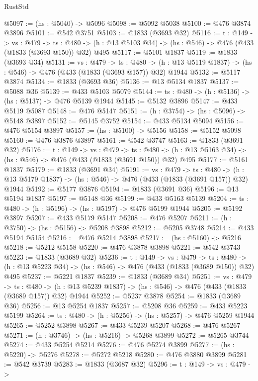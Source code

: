 \begin{lexlean}{RustStd}
\begin{coremodule}
@5097 := (hs : @5040) -> @5096
@5098 := @5092 @5038
@5100 := @476 @3874 @3896
@5101 := @542 @3751
@5103 := @1833 (@3693 @32)
@5116 := {t : @149} ->
  {vs : @479} ->
  {ts : @480} -> (h : @13 @5103 @34) -> (hs : @546) -> @476 (@433 (@1833 (@3693 @150)) @32) @495
@5117 := @5101 @1837
@5119 := @1833 (@3693 @34)
@5131 := {vs : @479} ->
  {ts : @480} -> (h : @13 @5119 @1837) -> (hs : @546) -> @476 (@433 (@1833 (@3693 @157)) @32) @1944
@5132 := @5117 @3874
@5134 := @1833 (@3693 @36)
@5136 := @13 @5134 @1837
@5137 := @5088 @36
@5139 := @433 @5103 @5079
@5144 := {ts : @480} -> (h : @5136) -> (hs : @5137) -> @476 @5139 @1944
@5145 := @5132 @3896
@5147 := @433 @5119 @5087
@5148 := @476 @5147
@5151 := (h : @3754) -> (hs : @5096) -> @5148 @3897
@5152 := @5145 @3752
@5154 := @433 @5134 @5094
@5156 := @476 @5154 @3897
@5157 := (hs : @5100) -> @5156
@5158 := @5152 @5098
@5160 := @476 @3876 @3897
@5161 := @542 @3747
@5163 := @1833 (@3691 @32)
@5176 := {t : @149} ->
  {vs : @479} ->
  {ts : @480} -> (h : @13 @5163 @34) -> (hs : @546) -> @476 (@433 (@1833 (@3691 @150)) @32) @495
@5177 := @5161 @1837
@5179 := @1833 (@3691 @34)
@5191 := {vs : @479} ->
  {ts : @480} -> (h : @13 @5179 @1837) -> (hs : @546) -> @476 (@433 (@1833 (@3691 @157)) @32) @1944
@5192 := @5177 @3876
@5194 := @1833 (@3691 @36)
@5196 := @13 @5194 @1837
@5197 := @5148 @36
@5199 := @433 @5163 @5139
@5204 := {ts : @480} -> (h : @5196) -> (hs : @5197) -> @476 @5199 @1944
@5205 := @5192 @3897
@5207 := @433 @5179 @5147
@5208 := @476 @5207
@5211 := (h : @3750) -> (hs : @5156) -> @5208 @3898
@5212 := @5205 @3748
@5214 := @433 @5194 @5154
@5216 := @476 @5214 @3898
@5217 := (hs : @5160) -> @5216
@5218 := @5212 @5158
@5220 := @476 @3878 @3898
@5221 := @542 @3743
@5223 := @1833 (@3689 @32)
@5236 := {t : @149} ->
  {vs : @479} ->
  {ts : @480} -> (h : @13 @5223 @34) -> (hs : @546) -> @476 (@433 (@1833 (@3689 @150)) @32) @495
@5237 := @5221 @1837
@5239 := @1833 (@3689 @34)
@5251 := {vs : @479} ->
  {ts : @480} -> (h : @13 @5239 @1837) -> (hs : @546) -> @476 (@433 (@1833 (@3689 @157)) @32) @1944
@5252 := @5237 @3878
@5254 := @1833 (@3689 @36)
@5256 := @13 @5254 @1837
@5257 := @5208 @36
@5259 := @433 @5223 @5199
@5264 := {ts : @480} -> (h : @5256) -> (hs : @5257) -> @476 @5259 @1944
@5265 := @5252 @3898
@5267 := @433 @5239 @5207
@5268 := @476 @5267
@5271 := (h : @3746) -> (hs : @5216) -> @5268 @3899
@5272 := @5265 @3744
@5274 := @433 @5254 @5214
@5276 := @476 @5274 @3899
@5277 := (hs : @5220) -> @5276
@5278 := @5272 @5218
@5280 := @476 @3880 @3899
@5281 := @542 @3739
@5283 := @1833 (@3687 @32)
@5296 := {t : @149} ->
  {vs : @479} ->

\end{coremodule}
\end{lexlean}

